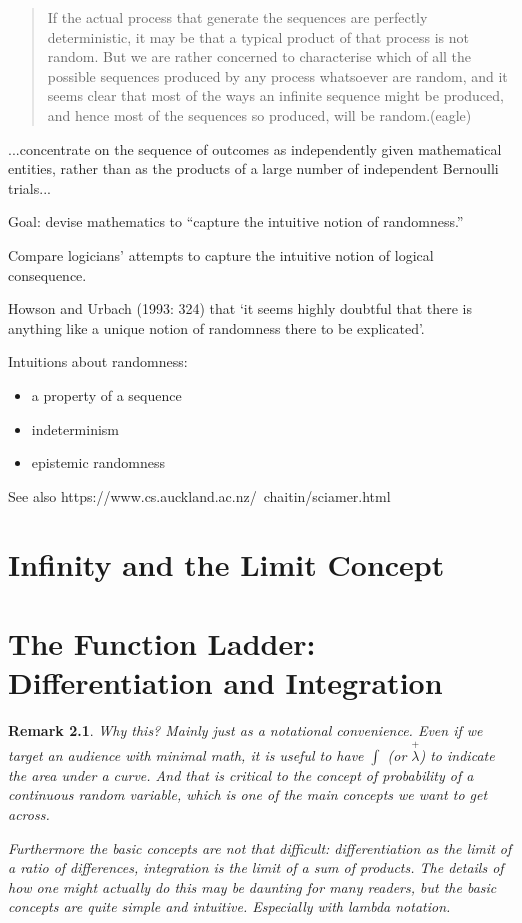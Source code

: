 \documentclass[reqno,12pt]{tufte-book}
\numberwithin{equation}{subsection}
\newtheorem{remark}{Remark}
\begin{document}
\blockquote{If the actual process that generate the sequences are perfectly deterministic, it may be that a typical product of that process is not random. But we are rather concerned to characterise which of all the possible sequences produced by any process whatsoever are random, and it seems clear that most of the ways an infinite sequence might be produced, and hence most of the sequences so produced, will be random.(eagle)}

...concentrate on the sequence of outcomes as independently given mathematical entities, rather than as the products of a large number of independent Bernoulli trials...


Goal: devise mathematics to ``capture the intuitive notion of randomness.''

Compare logicians' attempts to capture the intuitive notion of logical consequence.

 Howson and Urbach (1993: 324) that ‘it seems highly doubtful that there is anything like a unique notion of randomness there to be explicated’.

Intuitions about randomness:

\begin{itemize}
\item a property of a sequence
\item indeterminism
\item epistemic randomness
\end{itemize}


See also https://www.cs.auckland.ac.nz/~chaitin/sciamer.html

\chapter{Infinity and the Limit Concept}

\chapter{The Function Ladder: Differentiation and Integration}

\begin{remark}
  Why this?  Mainly just as a notational convenience.  Even if we target an
  audience with minimal math, it is useful to have $\int$ (or
  $\overset{+}{\lambda}$) to indicate the area under a curve.  And
  that is critical to the concept of probability of a continuous
  random variable, which is one of the main concepts we want to get
  across.

  Furthermore the basic concepts are not that difficult:
  differentiation as the limit of a ratio of differences, integration
  is the limit of a sum of products.  The details of how one might
  actually do this may be daunting for many readers, but the basic
  concepts are quite simple and intuitive.  Especially with lambda
  notation.
\end{remark}
\end{document}
